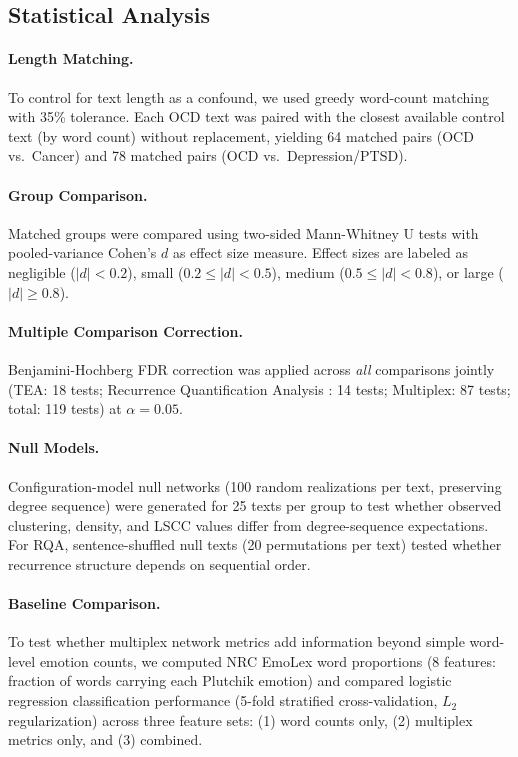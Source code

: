 \documentclass[11pt,a4paper]{article}
\begin{document}
\subsection{Statistical Analysis}

\paragraph{Length Matching.}  To control for text length as a confound, we used greedy word-count matching with 35\% tolerance.  Each OCD text was paired with the closest available control text (by word count) without replacement, yielding 64 matched pairs (OCD vs.\ Cancer) and 78 matched pairs (OCD vs.\ Depression/PTSD).

\paragraph{Group Comparison.}  Matched groups were compared using two-sided Mann-Whitney U tests with pooled-variance Cohen's $d$ as effect size measure.  Effect sizes are labeled as negligible ($|d|<0.2$), small ($0.2 \le |d| < 0.5$), medium ($0.5 \le |d| < 0.8$), or large ($|d| \ge 0.8$).

\paragraph{Multiple Comparison Correction.}  Benjamini-Hochberg \citep{benjamini1995fdr} FDR correction was applied across \textit{all} comparisons jointly (TEA: 18 tests; Recurrence Quantification Analysis \citep[RQA;][]{marwan2007rqa}: 14 tests; Multiplex: 87 tests; total: 119 tests) at $\alpha = 0.05$.

\paragraph{Null Models.}  Configuration-model null networks (100 random realizations per text, preserving degree sequence) were generated for 25 texts per group to test whether observed clustering, density, and LSCC values differ from degree-sequence expectations.  For RQA, sentence-shuffled null texts (20 permutations per text) tested whether recurrence structure depends on sequential order.

\paragraph{Baseline Comparison.}  To test whether multiplex network metrics add information beyond simple word-level emotion counts, we computed NRC EmoLex word proportions (8 features: fraction of words carrying each Plutchik emotion) and compared logistic regression classification performance (5-fold stratified cross-validation, $L_2$ regularization) across three feature sets: (1) word counts only, (2) multiplex metrics only, and (3) combined.
\end{document}
